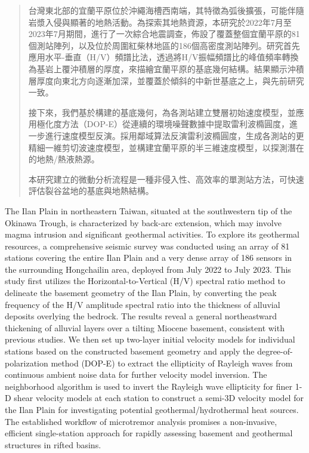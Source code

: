 
\begin{abstract}
    台灣東北部的宜蘭平原位於沖繩海槽西南端，其特徵為弧後擴張，可能伴隨岩漿入侵與顯著的地熱活動。為探索其地熱資源，本研究於2022年7月至2023年7月期間，進行了一次綜合地震調查，佈設了覆蓋整個宜蘭平原的81個測站陣列，以及位於周圍紅柴林地區的186個高密度測站陣列。研究首先應用水平-垂直（H/V）頻譜比法，透過將H/V振幅頻譜比的峰值頻率轉換為基岩上覆沖積層的厚度，來描繪宜蘭平原的基底幾何結構。結果顯示沖積層厚度向東北方向逐漸加深，並覆蓋於傾斜的中新世基底之上，與先前研究一致。

接下來，我們基於構建的基底幾何，為各測站建立雙層初始速度模型，並應用極化度方法（DOP-E）從連續的環境噪聲數據中提取雷利波橢圓度，進一步進行速度模型反演。採用鄰域算法反演雷利波橢圓度，生成各測站的更精細一維剪切波速度模型，並構建宜蘭平原的半三維速度模型，以探測潛在的地熱/熱液熱源。

本研究建立的微動分析流程是一種非侵入性、高效率的單測站方法，可快速評估裂谷盆地的基底與地熱結構。
\end{abstract}

\begin{abstract*}
    The Ilan Plain in northeastern Taiwan, situated at the southwestern tip of the Okinawa Trough, is characterized by back-arc extension, which may involve magma intrusion and significant geothermal activities. To explore its geothermal resources, a comprehensive seismic survey was conducted using an array of 81 stations covering the entire Ilan Plain and a very dense array of 186 sensors in the surrounding Hongchailin area, deployed from July 2022 to July 2023. This study first utilizes the Horizontal-to-Vertical (H/V) spectral ratio method to delineate the basement geometry of the Ilan Plain, by converting the peak frequency of the H/V amplitude spectral ratio into the thickness of alluvial deposits overlying the bedrock. The results reveal a general northeastward thickening of alluvial layers over a tilting Miocene basement, consistent with previous studies. We then set up two-layer initial velocity models for individual stations based on the constructed basement geometry and apply the degree-of-polarization method (DOP-E) to extract the ellipticity of Rayleigh waves from continuous ambient noise data for further velocity model inversion. The neighborhood algorithm is used to invert the Rayleigh wave ellipticity for finer 1-D shear velocity models at each station to construct a semi-3D velocity model for the Ilan Plain for investigating potential geothermal/hydrothermal heat sources. The established workflow of microtremor analysis promises a non-invasive, efficient single-station approach for rapidly assessing basement and geothermal structures in rifted basins.
    \end{abstract*}